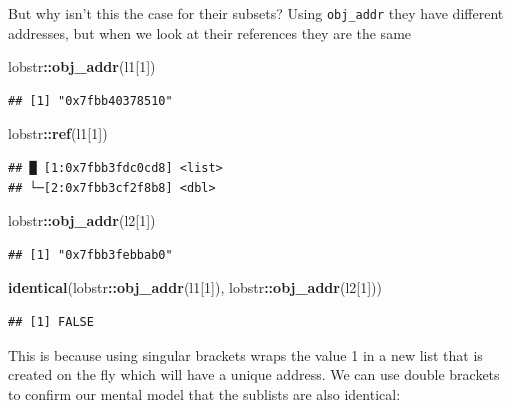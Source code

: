 \documentclass[]{book}
\newenvironment{Shaded}{\begin{snugshade}}{\end{snugshade}}
\newcommand{\DecValTok}[1]{\textcolor[rgb]{0.00,0.00,0.81}{#1}}
\newcommand{\KeywordTok}[1]{\textcolor[rgb]{0.13,0.29,0.53}{\textbf{#1}}}
\newcommand{\NormalTok}[1]{#1}
\newcommand{\OperatorTok}[1]{\textcolor[rgb]{0.81,0.36,0.00}{\textbf{#1}}}
\begin{document}
But why isn't this the case for their subsets? Using \texttt{obj\_addr} they have different addresses, but when we look at their references they are the same

\begin{Shaded}
\begin{Highlighting}[]
\NormalTok{lobstr}\OperatorTok{::}\KeywordTok{obj_addr}\NormalTok{(l1[}\DecValTok{1}\NormalTok{])}
\end{Highlighting}
\end{Shaded}

\begin{verbatim}
## [1] "0x7fbb40378510"
\end{verbatim}

\begin{Shaded}
\begin{Highlighting}[]
\NormalTok{lobstr}\OperatorTok{::}\KeywordTok{ref}\NormalTok{(l1[}\DecValTok{1}\NormalTok{])}
\end{Highlighting}
\end{Shaded}

\begin{verbatim}
## █ [1:0x7fbb3fdc0cd8] <list> 
## └─[2:0x7fbb3cf2f8b8] <dbl>
\end{verbatim}

\begin{Shaded}
\begin{Highlighting}[]
\NormalTok{lobstr}\OperatorTok{::}\KeywordTok{obj_addr}\NormalTok{(l2[}\DecValTok{1}\NormalTok{])}
\end{Highlighting}
\end{Shaded}

\begin{verbatim}
## [1] "0x7fbb3febbab0"
\end{verbatim}

\begin{Shaded}
\begin{Highlighting}[]
\KeywordTok{identical}\NormalTok{(lobstr}\OperatorTok{::}\KeywordTok{obj_addr}\NormalTok{(l1[}\DecValTok{1}\NormalTok{]), lobstr}\OperatorTok{::}\KeywordTok{obj_addr}\NormalTok{(l2[}\DecValTok{1}\NormalTok{]))}
\end{Highlighting}
\end{Shaded}

\begin{verbatim}
## [1] FALSE
\end{verbatim}

This is because using singular brackets wraps the value 1 in a new list that is created on the fly which will have a unique address. We can use double brackets to confirm our mental model that the sublists are also identical:
\end{document}
